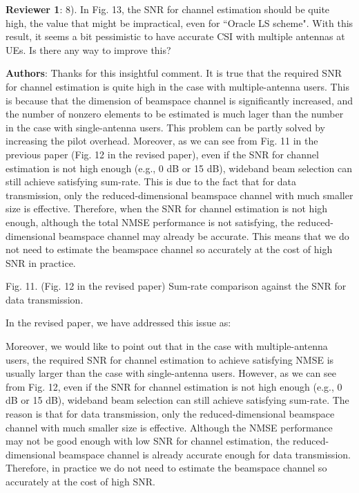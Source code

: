 \documentclass[a4paper,12pt]{article}
\begin{document}
\textbf{Reviewer 1}: 8). In Fig. 13, the SNR for channel estimation should be quite high, the value that might be impractical, even for ``Oracle LS scheme". With this result, it seems a bit pessimistic to have accurate CSI with multiple antennas at UEs. Is there any way to improve this?

{\color{blue} \textbf{Authors}: Thanks for this insightful comment. It is true that the required SNR for channel estimation  is quite high in the case with multiple-antenna users. This is because that the dimension of beamspace channel is significantly increased, and the number of nonzero elements to be estimated is much lager than the number in the case with single-antenna users. This problem can be partly solved by increasing the pilot overhead. Moreover, as we can see from Fig. 11 in the previous paper (Fig. 12 in the revised paper), even if the SNR for channel estimation is not high enough (e.g., 0 dB or 15 dB), wideband beam selection can still achieve satisfying sum-rate. This is due to the fact that for data transmission, only the  reduced-dimensional beamspace channel with much smaller size is effective. Therefore, when the SNR for channel estimation is not high enough, although the total NMSE performance is not satisfying, the reduced-dimensional beamspace channel may already be accurate. This means that we do not need to estimate the beamspace channel so accurately at the cost of high SNR in practice.


Fig. 11. (Fig. 12 in the revised paper) Sum-rate comparison against the SNR for data transmission.


In the revised paper, we have addressed this issue as:
\begin{framed}
{\color{red} Moreover, we would like to point out that in the case with multiple-antenna users, the required SNR for channel estimation to achieve satisfying NMSE is usually larger than the case with single-antenna users. However, as we can see from Fig. 12, even if the SNR for channel estimation is not high enough (e.g., 0 dB or 15 dB), wideband beam selection can still achieve satisfying sum-rate. The reason is that for data transmission, only the  reduced-dimensional beamspace channel with much smaller size is effective. Although the  NMSE performance may not be good enough with low SNR for channel estimation, the  reduced-dimensional beamspace channel is already accurate enough for data transmission. Therefore, in practice we do not need to estimate the beamspace channel so accurately at the cost of high SNR.}
\end{framed}



}
\end{document}
